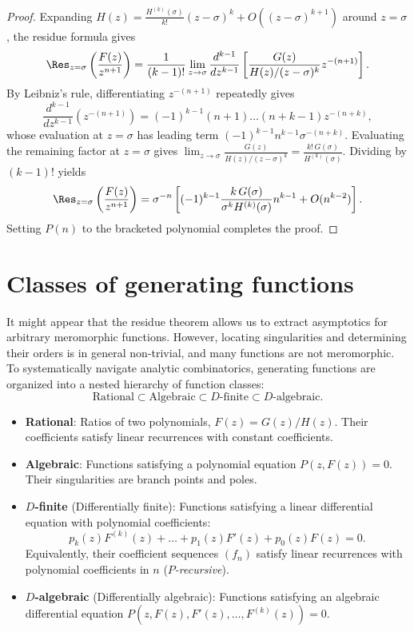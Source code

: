 \begin{proof}
    Expanding \(H(z) = \frac{H^{(k)}(\sigma)}{k!} (z - \sigma)^k + O((z - \sigma)^{k+1})\) around \(z = \sigma\), the residue formula gives
    \[
        \Res_{z = \sigma} \left( \frac{F(z)}{z^{n+1}} \right) = \frac{1}{(k-1)!} \lim_{z \to \sigma} \frac{d^{k-1}}{dz^{k-1}} \left[ \frac{G(z)}{H(z)/(z - \sigma)^k} z^{-(n+1)} \right].
    \]
    By Leibniz's rule, differentiating \(z^{-(n+1)}\) repeatedly gives
    \[
        \frac{d^{k-1}}{dz^{k-1}} \left( z^{-(n+1)} \right) = (-1)^{k-1} (n+1)\dots(n+k-1) z^{-(n+k)},
    \]
    whose evaluation at \(z = \sigma\) has leading term \((-1)^{k-1} n^{k-1} \sigma^{-(n+k)}\).
    Evaluating the remaining factor at \(z = \sigma\) gives \(\lim_{z \to \sigma} \frac{G(z)}{H(z)/(z - \sigma)^k} = \frac{k! \, G(\sigma)}{H^{(k)}(\sigma)}\).
    Dividing by \((k-1)!\) yields
    \[
        \Res_{z = \sigma} \left( \frac{F(z)}{z^{n+1}} \right) = \sigma^{-n} \left[ (-1)^{k-1} \frac{k \, G(\sigma)}{\sigma^k H^{(k)}(\sigma)} n^{k-1} + O(n^{k-2}) \right].
    \]
    Setting \(P(n)\) to the bracketed polynomial completes the proof.
\end{proof}


\section*{Classes of generating functions}

It might appear that the residue theorem allows us to extract asymptotics for arbitrary meromorphic functions.
However, locating singularities and determining their orders is in general non-trivial, and many functions are not meromorphic.
To systematically navigate analytic combinatorics, generating functions are organized into a nested hierarchy of function classes:
\[
    \text{Rational} \subset \text{Algebraic} \subset \text{$D$-finite} \subset \text{$D$-algebraic}.
\]
\begin{itemize}
    \item \textbf{Rational}: Ratios of two polynomials, \(F(z) = G(z)/H(z)\). Their coefficients satisfy linear recurrences with constant coefficients.
    \item \textbf{Algebraic}: Functions satisfying a polynomial equation \(P(z, F(z)) = 0\). Their singularities are branch points and poles.
    \item \textbf{$D$-finite} (Differentially finite): Functions satisfying a linear differential equation with polynomial coefficients:
    \[
        p_k(z) F^{(k)}(z) + \dots + p_1(z) F'(z) + p_0(z) F(z) = 0.
    \]
    Equivalently, their coefficient sequences \((f_n)\) satisfy linear recurrences with polynomial coefficients in \(n\) (\emph{\(P\)-recursive}).
    \item \textbf{$D$-algebraic} (Differentially algebraic): Functions satisfying an algebraic differential equation \(P(z, F(z), F'(z), \dots, F^{(k)}(z)) = 0\).
\end{itemize}

